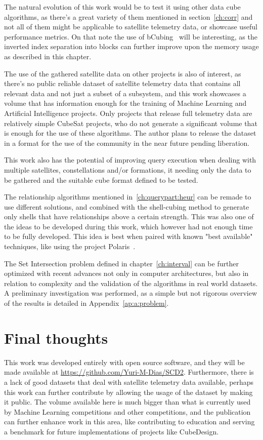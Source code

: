 The natural evolution of this work would be to test it using other data cube algorithms, as there's a great variety of them mentioned in section~\ref{ch:corr} and not all of them might be applicable to satellite telemetry data, or showcase useful performance metrics.
On that note the use of bCubing~\cite{silva:2015:abordagensParaCubo} will be interesting, as the inverted index separation into blocks can further improve upon the memory usage as described in this chapter.

The use of the gathered satellite data on other projects is also of interest, as there's no public reliable dataset of satellite telemetry data that contains all relevant data and not just a subset of a subsystem, and this work showcases a volume that has information enough for the training of Machine Learning and Artificial Intelligence projects.
Only projects that release full telemetry data are relatively simple CubeSat projects, who do not generate a significant volume that is enough for the use of these algorithms.
The author plans to release the dataset in a format for the use of the community in the near future pending liberation.

This work also has the potential of improving query execution when dealing with multiple satellites, constellations and/or formations, it needing only the data to be gathered and the suitable cube format defined to be tested.

The relationship algorithms mentioned in~\autoref{ch:querypart:heur} can be remade to use different solutions, and combined with the shell-cubing method to generate only shells that have relationships above a certain strength.
This was also one of the ideas to be developed during this work, which however had not enough time to be fully developed.
This idea is best when paired with known "best available" techniques, like using the project Polaris~\cite{librespacefoundationPolaris2021}.

The Set Intersection problem defined in chapter~\ref{ch:interval} can be further optimized with recent advances not only in computer architectures, but also in relation to complexity and the validation of the algorithms in real world datasets.
A preliminary investigation was performed, as a simple but not rigorous overview of the results is detailed in Appendix~\ref{ap:a:problem}.

\section{Final thoughts}\label{ch:concl:final}

This work was developed entirely with open source software, and they will be made available at \url{https://github.com/Yuri-M-Dias/SCD2}.
Furthermore, there is a lack of good datasets that deal with satellite telemetry data available, perhaps this work can further contribute by allowing the usage of the dataset by making it public.
The volume available here is much bigger than what is currently used by Machine Learning competitions and other competitions, and the publication can further enhance work in this area, like contributing to education and serving a benchmark for future implementations of projects like CubeDesign.

